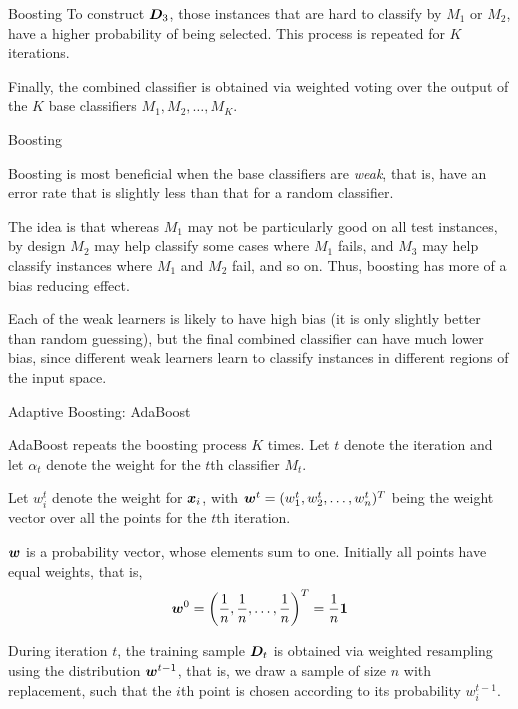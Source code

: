 {\begin{frame}{Boosting}
\medskip
To construct
${\boldsymbol D}_3$, those instances that are hard to classify by $M_1$ or $M_2$,
have a higher probability of being selected.
This process is repeated
for $K$ iterations. 

\medskip
F{i}nally, the combined classif\/{i}er
is obtained via weighted voting over the output of the $K$ base
classif\/{i}ers $M_1, M_2, \ldots, M_K$.
\end{frame}


\begin{frame}{Boosting}

  Boosting is most benef\/{i}cial when the base classif\/{i}ers are {\em
weak}, that is, have an error rate that is slightly less than that
for a random classif\/{i}er. 

\medskip
The idea is that whereas $M_1$ may not be
particularly good on all test instances, by design $M_2$ may help
classify some cases where $M_1$ fails, and $M_3$ may help classify
instances where
 $M_1$ and $M_2$ fail, and so on. Thus,
boosting has more of a bias reducing effect. 

\medskip
Each of the weak learners
is likely to have high bias (it is only slightly better than random
guessing), but the f\/{i}nal combined classif\/{i}er can have much lower bias,
since different weak learners learn to classify instances in
different regions of the input space.
\end{frame}



\begin{frame}{Adaptive Boosting: AdaBoost}

AdaBoost repeats the boosting process $K$ times.
Let $t$ denote the iteration and let $\alpha_t$ denote the weight
for the $t$th classif\/{i}er $M_t$. 

\medskip
Let $w^t_i$ denote the weight for
${\boldsymbol x}_i$, with ${\boldsymbol w}^t = (w^t_1, w^t_2, \ldots, w^t_n)^T$ being the
weight vector over all the points for the $t$th iteration. 

\medskip
${\boldsymbol w}$ is a probability vector, whose elements sum to one.
Initially all points have equal weights, that is,
\begin{align*}
  {\boldsymbol w}^0 = \left(\frac{1}{n}, \frac{1}{n}, \ldots, \frac{1}{n}\right)^T =
  \frac{1}{n}\mathbf{1}
\end{align*}

\medskip
During iteration $t$, the
training sample ${\boldsymbol D}_{t}$ is obtained via weighted resampling
using the distribution ${\boldsymbol w}^{t-1}$, that is, we draw a sample of
size $n$ with replacement, such that the $i$th point is chosen
according to its probability $w^{t-1}_i$. 


\end{frame}}
